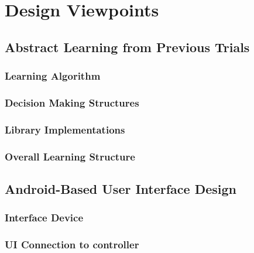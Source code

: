 \documentclass[draftclsnofoot,onecolumn,letterpaper,10pt]{IEEEtran}
\begin{document}
\section{Design Viewpoints}

\subsection{Abstract Learning from Previous Trials} %
\subsubsection{Learning Algorithm} %

\subsubsection{Decision Making Structures}

\subsubsection{Library Implementations}

\subsubsection{Overall Learning Structure}

\subsection{Android-Based User Interface Design} %
\subsubsection{Interface Device}

\subsubsection{UI Connection to controller}
\end{document}
